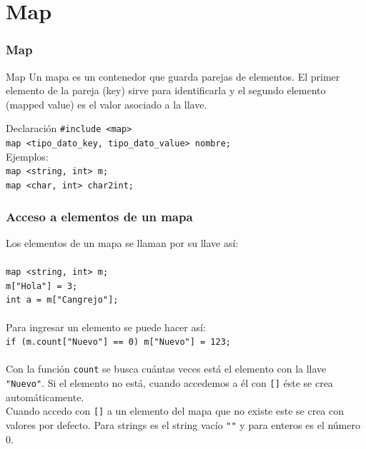 \documentclass{beamer}
\begin{document}
\section{Map}
	\begin{frame}[fragile]
		\frametitle{Map}
		\begin{block}{Map}
			Un mapa es un contenedor que guarda parejas de elementos. El primer elemento de la pareja (key) sirve para identificarla y el segundo elemento (mapped value) es el valor asociado a la llave.\\
		\end{block}
		\begin{block}{Declaración}
			\verb|#include <map>|\\
			\verb|map <tipo_dato_key, tipo_dato_value> nombre;|\\
			Ejemplos:\\
			\verb|map <string, int> m;|\\
			\verb|map <char, int> char2int;|
		\end{block}
	\end{frame}
	
	\begin{frame}[fragile]
		\frametitle{Acceso a elementos de un mapa}
		Los elementos de un mapa se llaman por su llave así:\\ \quad \\
		\verb|map <string, int> m;|\\
		\verb|m["Hola"] = 3;|\\
		\verb|int a = m["Cangrejo"];|\\ \quad \\
		
		Para ingresar un elemento se puede hacer así:\\
		\verb|if (m.count["Nuevo"] == 0) m["Nuevo"] = 123;|\\ \quad \\
		Con la función \verb|count| se busca cuántas veces está el elemento con la llave \verb|"Nuevo"|. Si el elemento no está, cuando accedemos a él con \verb|[]| éste se crea automáticamente.\\
		Cuando accedo con \verb|[]| a un elemento del mapa que no existe este se crea con valores por defecto. Para strings es el string vacío \verb|""| y para enteros es el número 0.
	\end{frame}
	
\end{document}
